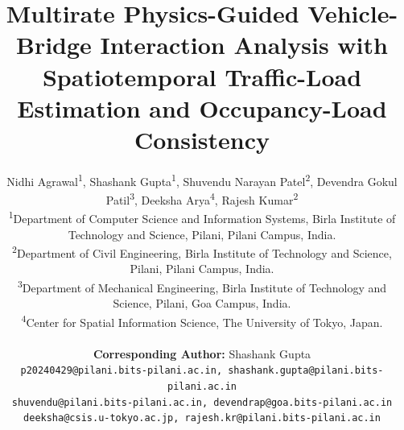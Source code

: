 \documentclass[journal]{IEEEtran}
\begin{document}
   
\title{Multirate Physics-Guided Vehicle-Bridge Interaction Analysis with Spatiotemporal Traffic-Load Estimation and Occupancy-Load Consistency}


\author{\footnotesize
    Nidhi Agrawal\textsuperscript{1},
    Shashank Gupta\textsuperscript{1},
    Shuvendu Narayan Patel\textsuperscript{2},
    Devendra Gokul Patil\textsuperscript{3},
    Deeksha Arya\textsuperscript{4},
    Rajesh Kumar\textsuperscript{2}

    {\small
    \textsuperscript{1}Department of Computer Science and Information Systems, Birla Institute of Technology and Science, Pilani, Pilani Campus, India. \\
    \textsuperscript{2}Department of Civil Engineering, Birla Institute of Technology and Science, Pilani, Pilani Campus, India. \\
    \textsuperscript{3}Department of Mechanical Engineering, Birla Institute of Technology and Science, Pilani, Goa Campus, India. \\
    \textsuperscript{4}Center for Spatial Information Science, The University of Tokyo, Japan. \\
    }

    {\scriptsize \textbf{Corresponding Author:} Shashank Gupta} \\[0.ex]
    \scriptsize
    \texttt{p20240429@pilani.bits-pilani.ac.in, shashank.gupta@pilani.bits-pilani.ac.in} \\
    \texttt{shuvendu@pilani.bits-pilani.ac.in, devendrap@goa.bits-pilani.ac.in} \\
    \texttt{deeksha@csis.u-tokyo.ac.jp, rajesh.kr@pilani.bits-pilani.ac.in}
}


\maketitle
\end{document}
